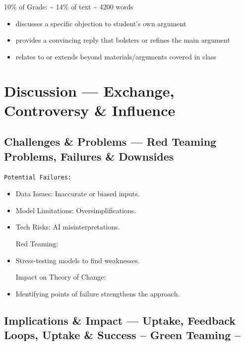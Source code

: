 \documentclass[
  letterpaper,
]{book}
\providecommand{\tightlist}{%
  \setlength{\itemsep}{0pt}\setlength{\parskip}{0pt}}
\begin{document}
10\% of Grade: \textasciitilde{} 14\% of text \textasciitilde{} 4200
words

\begin{itemize}
\tightlist
\item
  discusses a specific objection to student's own argument
\item
  provides a convincing reply that bolsters or refines the main argument
\item
  relates to or extends beyond materials/arguments covered in class
\end{itemize}


\chapter{Discussion --- Exchange, Controversy \&
Influence}\label{discussion-exchange-controversy-influence}

\section{Challenges \& Problems --- Red Teaming Problems, Failures \&
Downsides}\label{challenges-problems-red-teaming-problems-failures-downsides}

\begin{verbatim}
Potential Failures:
\end{verbatim}

\begin{itemize}
\item
  Data Issues: Inaccurate or biased inputs.\\
\item
  Model Limitations: Oversimplifications.\\
\item
  Tech Risks: AI misinterpretations.

  Red Teaming:
\item
  Stress-testing models to find weaknesses.

  Impact on Theory of Change:
\item
  Identifying points of failure strengthens the approach.
\end{itemize}

\section{Implications \& Impact --- Uptake, Feedback Loops, Uptake \&
Success -- Green Teaming
--}\label{implications-impact-uptake-feedback-loops-uptake-success-green-teaming}
\end{document}
